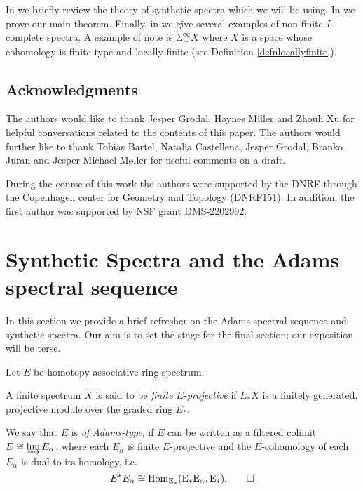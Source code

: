 In  we briefly review the theory of synthetic spectra which we will be using.
In  we prove our main theorem.
Finally, in  we give several examples of non-finite $I$-complete spectra.
A example of note is $\Sigma_+^\infty X$ where $X$ is a space whose cohomology is finite type and locally finite (see Definition \ref{defnlocallyfinite}). 

\subsection*{Acknowledgments}

The authors would like to thank Jesper Grodal, Haynes Miller and Zhouli Xu for helpful conversations related to the contents of this paper.
The authors would further like to thank Tobias Bartel, Natalia Castellena, Jesper Grodal, Branko Juran and Jesper Michael M{\o}ller for useful comments on a draft.

During the course of this work the authors were supported by the DNRF through the Copenhagen center for Geometry and Topology (DNRF151).
In addition, the first author was supported by NSF grant DMS-2202992. 























\section{Synthetic Spectra and the Adams spectral sequence} \label{sec:syn}

In this section we provide a brief refresher on the Adams spectral sequence and synthetic spectra.
Our aim is to set the stage for the final section; our exposition will be terse. 


\begin{defn}     Let $E$ be homotopy associative ring spectrum.
    
    A finite spectrum $X$ is said to be \emph{finite $E$-projective} if $E_{*}X$ is a finitely generated, projective module over the graded ring $E_{*}$.
    
    We say that $E$ is \emph{of Adams-type}, 
    if $E$ can be written as a filtered colimit $E \cong \varinjlim E_{\alpha}$, where each $E_{\alpha}$ is finite $E$-projective and the $E$-cohomology of each $E_{\alpha}$ is dual to its homology, i.e. 
    $$ E^{*}E_{\alpha} \cong \rm{Hom}_{E_{*}}(E_{*}E_{\alpha}, E_{*}).\hfill\qedhere $$
\end{defn}


